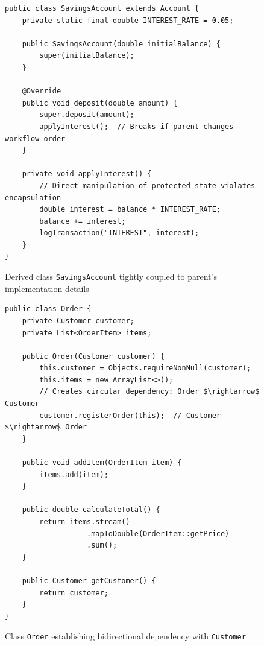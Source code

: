 \begin{figure}[htbp]
    \centering
    \begin{verbatim}
public class SavingsAccount extends Account {
    private static final double INTEREST_RATE = 0.05;
    
    public SavingsAccount(double initialBalance) {
        super(initialBalance);
    }
    
    @Override
    public void deposit(double amount) {
        super.deposit(amount);
        applyInterest();  // Breaks if parent changes workflow order
    }
    
    private void applyInterest() {
        // Direct manipulation of protected state violates encapsulation
        double interest = balance * INTEREST_RATE;
        balance += interest; 
        logTransaction("INTEREST", interest);
    }
}
    \end{verbatim}
    \caption{Derived class \texttt{SavingsAccount} tightly coupled to parent's implementation details}
    \label{fig:savings-derived}
\end{figure}

\begin{figure}[htbp]
    \centering
    \begin{verbatim}
public class Order {
    private Customer customer;
    private List<OrderItem> items;
    
    public Order(Customer customer) {
        this.customer = Objects.requireNonNull(customer);
        this.items = new ArrayList<>();
        // Creates circular dependency: Order $\rightarrow$ Customer
        customer.registerOrder(this);  // Customer $\rightarrow$ Order
    }
    
    public void addItem(OrderItem item) {
        items.add(item);
    }
    
    public double calculateTotal() {
        return items.stream()
                   .mapToDouble(OrderItem::getPrice)
                   .sum();
    }
    
    public Customer getCustomer() {
        return customer;
    }
}
    \end{verbatim}
    \caption{Class \texttt{Order} establishing bidirectional dependency with \texttt{Customer}}
    \label{fig:order-circular}
\end{figure}

